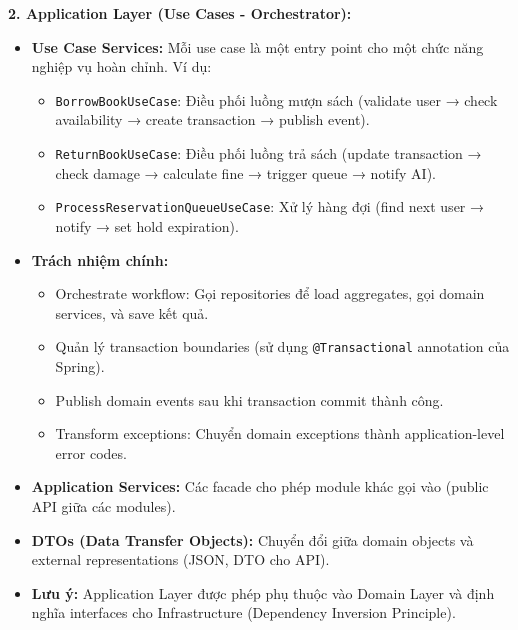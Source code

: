 \textbf{2. Application Layer (Use Cases - Orchestrator):}
\begin{itemize}
    \item \textbf{Use Case Services:} Mỗi use case là một entry point cho một chức năng nghiệp vụ hoàn chỉnh. Ví dụ:
    \begin{itemize}
        \item \texttt{BorrowBookUseCase}: Điều phối luồng mượn sách (validate user → check availability → create transaction → publish event).
        \item \texttt{ReturnBookUseCase}: Điều phối luồng trả sách (update transaction → check damage → calculate fine → trigger queue → notify AI).
        \item \texttt{ProcessReservationQueueUseCase}: Xử lý hàng đợi (find next user → notify → set hold expiration).
    \end{itemize}
    
    \item \textbf{Trách nhiệm chính:}
    \begin{itemize}
        \item Orchestrate workflow: Gọi repositories để load aggregates, gọi domain services, và save kết quả.
        \item Quản lý transaction boundaries (sử dụng \texttt{@Transactional} annotation của Spring).
        \item Publish domain events sau khi transaction commit thành công.
        \item Transform exceptions: Chuyển domain exceptions thành application-level error codes.
    \end{itemize}
    
    \item \textbf{Application Services:} Các facade cho phép module khác gọi vào (public API giữa các modules).
    
    \item \textbf{DTOs (Data Transfer Objects):} Chuyển đổi giữa domain objects và external representations (JSON, DTO cho API).
    
    \item \textbf{Lưu ý:} Application Layer được phép phụ thuộc vào Domain Layer và định nghĩa interfaces cho Infrastructure (Dependency Inversion Principle).
\end{itemize}



